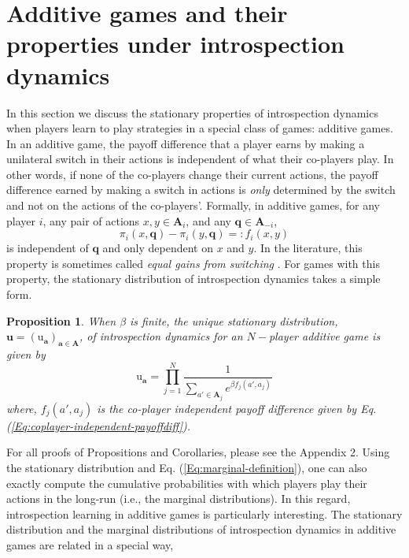 \documentclass[11pt]{article}
\theoremstyle{plainCl1}
\newtheorem{Prop}{Proposition}
\theoremstyle{plainCl2}
\newcommand{\A}{\mathbf{A}}
\newcommand{\abf}{\mathbf{a}}
\newcommand{\qbf}{\mathbf{q}}
\newcommand{\ubf}{\mathbf{u}}
\begin{document}
\section{Additive games and their properties under introspection dynamics}
In this section we discuss the stationary properties of introspection dynamics when players learn to play strategies in a special class of games: additive games. In an additive game, the payoff difference that a player earns by making a unilateral switch in their actions is independent of what their co-players play. In other words, if none of the co-players change their current actions, the payoff difference earned by making a switch in actions is \emph{only} determined by the switch and not on the actions of the co-players'. Formally, in additive games, for any player $i$, any pair of actions $x,y \in \A_i$, and any $\qbf \in \A_{-i}$,
\begin{equation}
\pi_i(x, \qbf) - \pi_i(y, \qbf) =: f_i(x,y) 
\label{Eq:coplayer-independent-payoffdiff}
\end{equation}
\noindent is independent of $\qbf$ and only dependent on $x$ and $y$. In the literature, this property is sometimes called \emph{equal gains from switching} \cite{Nowak:AAM:1990, Van-Veelen:JTB:2009}. For games with this property, the stationary distribution of introspection dynamics takes a simple form.

 \begin{Prop}
When $\beta$ is finite, the unique stationary distribution, $\ubf = (\mathrm{u}_\abf)_{\abf \in \A}$, of introspection dynamics for an $N-$player additive game is given by
\begin{equation}
\mathrm{u}_\abf = \prod_{j=1}^N \frac{1}{\displaystyle \sum_{a' \in \A_j} e^{\beta f_j(a', a_j)}} 
\label{Eq:additive-game-stationary-distribution}
\end{equation}
where, $f_j(a', a_j)$ is the co-player independent payoff difference given by Eq. (\ref{Eq:coplayer-independent-payoffdiff}).

\label{Th:additive-games-stationary-dist}
\end{Prop}
\noindent For all proofs of Propositions and Corollaries, please see the Appendix 2. Using the stationary distribution and Eq. (\ref{Eq:marginal-definition}), one can also exactly compute the cumulative probabilities with which players play their actions in the long-run (i.e., the marginal distributions). In this regard, introspection learning in additive games is particularly interesting. The stationary distribution and the marginal distributions of introspection dynamics in additive games are related in a special way, 
\end{document}
